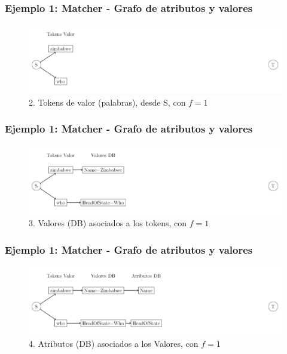 \begin{frame}
\frametitle{Ejemplo 1: Matcher - Grafo de atributos y valores}
\begin{figure}
  \centering
    \includegraphics[scale=.33]{graficos/presentacion/ejemplo-grafo-matcher-1-3}
    \caption{2. Tokens de valor (palabras), desde S, con $f=1$}
\end{figure}
\end{frame}

\begin{frame}
\frametitle{Ejemplo 1: Matcher - Grafo de atributos y valores}
\begin{figure}
  \centering
    \includegraphics[scale=.33]{graficos/presentacion/ejemplo-grafo-matcher-1-4}
    \caption{3. Valores (DB) asociados a los tokens, con $f=1$}
\end{figure}
\end{frame}

\begin{frame}
\frametitle{Ejemplo 1: Matcher - Grafo de atributos y valores}
\begin{figure}
  \centering
    \includegraphics[scale=.33]{graficos/presentacion/ejemplo-grafo-matcher-1-5}
    \caption{4. Atributos (DB) asociados a los Valores, con $f=1$}
\end{figure}
\end{frame}

